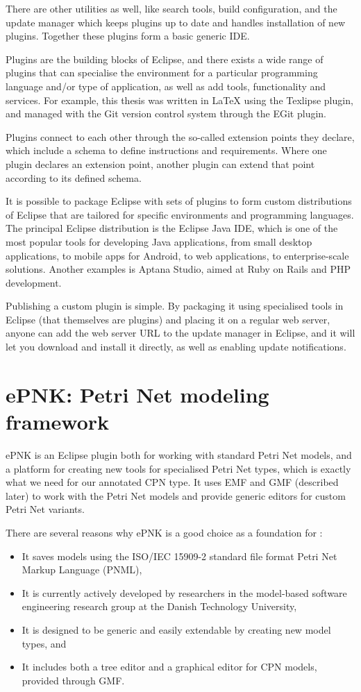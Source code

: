 There are other utilities as well, like search tools, build configuration, and
the update manager which keeps plugins up to date and handles installation of
new plugins. Together these plugins form a basic generic IDE.

Plugins are the building blocks
of Eclipse, and there exists a wide range of plugins that can specialise the
environment for a particular programming language and/or type of application,
as well as add tools, functionality and services. For example, this thesis was
written in \LaTeX{} using the Texlipse plugin, and managed with the Git version
control system through the EGit plugin.

Plugins connect to each other through the so-called extension points they
declare, which include a schema to define instructions and requirements.
Where one plugin declares an extension point, another plugin can extend that
point according to its defined schema.

It is possible to package Eclipse with sets of plugins to form custom
distributions of Eclipse that are tailored for specific environments and
programming languages. The principal Eclipse distribution is the Eclipse Java
IDE, which is one of the most popular tools for developing Java applications,
from small desktop applications, to mobile apps for Android, to web
applications, to enterprise-scale solutions. Another examples is Aptana Studio,
aimed at Ruby on Rails and PHP development. 

Publishing a custom plugin is simple. By packaging it using specialised tools
in Eclipse (that themselves are plugins) and placing it on a regular web
server, anyone can add the web server URL to the update manager in Eclipse, and
it will let you download and install it directly, as well as enabling update
notifications.


\section{ePNK: Petri Net modeling framework}
\label{sec:epnk}
ePNK is an Eclipse plugin both for working with standard Petri Net models, and a
platform for creating new tools for specialised Petri Net types, which is
exactly what we need for our annotated CPN type. It uses EMF and GMF
(described later) to work with the Petri Net models and provide generic
editors for custom Petri Net variants.

There are several reasons why ePNK is a good choice as a foundation for \thename{}:
\begin{itemize}
	\item It saves models using the ISO/IEC 15909-2 \cite{ISO-15909-2} standard
	file format Petri Net Markup Language (PNML),
	\item It is currently actively developed by researchers in the model-based
	software engineering research group at the Danish Technology University,
	\item It is designed to be generic and easily extendable by creating new model
	types, and
	\item It includes both a tree editor and a graphical editor for CPN models,
	provided through GMF.
\end{itemize}

